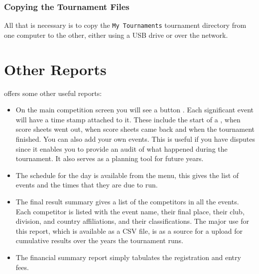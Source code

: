 \documentclass[a4paper,11pt]{memoir}
\begin{document}
\subsection{Copying the Tournament Files}

All that is necessary is to copy the \texttt{My Tournaments} tournament directory from one computer to the other, either using a USB drive or over the network.

\chapter{Other Reports}

\fencingtime{} offers some other useful reports:

\begin{itemize}
 \item On the main competition screen you will see a button . Each significant event will have a time stamp attached to it. These include the start of a , when score sheets went out, when score sheets came back and when the tournament finished. You can also add your own events. This is useful if you have disputes since it enables you to provide an audit of what happened during the tournament. It also serves as a planning tool for future years.
 \item The schedule for the day is available from the  menu, this gives the list of events and the times that they are due to run.
 \item The final result summary gives a list of the competitors in all the events. Each \gls{competitor} is listed with the event name, their final place, their \gls{club}, division, and country affiliations, and their classifications. The major use for this report, which is available as a CSV file, is as a source for a  upload for cumulative results over the years the tournament runs.
 \item The financial summary report simply tabulates the registration and entry fees.
\end{itemize}


\printglossary
{}

\cleardoublepage
\printindex
\end{document}
